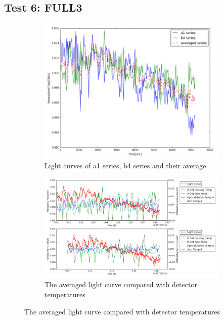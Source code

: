 \documentclass{aastex6}
\begin{document}
\subsection{Test 6: FULL3} 
\begin{figure}[H]
    \centering
    \begin{subfigure}{1}
        \includegraphics[scale=0.4]{ts_test6}
        \caption{Light curves of a1 series, b4 series and their average}
    \end{subfigure}

    \begin{subfigure}{2}
        \includegraphics[scale=0.4]{temp_test6}
        \caption{The averaged light curve compared with detector temperatures}
    \end{subfigure}
   

\end{figure}
\end{document}
